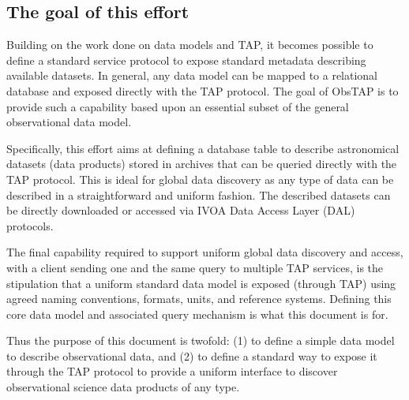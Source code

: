 \documentclass[11pt,a4paper]{ivoa}
\begin{document}
\subsection{The goal of this effort}
Building on the work done on data models and TAP, it becomes possible to define a standard service protocol to expose
standard metadata describing available datasets.  In general, any data model can be mapped to a relational database and
exposed directly with the TAP protocol.  The goal of ObsTAP is to provide such a capability based upon an essential
subset of the general observational data model.

Specifically, this effort aims at defining a database table to describe astronomical datasets (data products) stored in
archives that can be queried directly with the TAP protocol.  This is ideal for global data discovery as any type of
data can be described in a straightforward and uniform fashion.  The described datasets can be directly downloaded or
accessed via IVOA Data Access Layer (DAL) protocols. 

The final capability required to support uniform global data discovery and access, with a client sending one and the
same query to multiple TAP services, is the stipulation that a uniform standard data model is exposed (through TAP)
using agreed naming conventions, formats, units, and reference systems.  Defining this core data model and associated
query mechanism is what this document is for.  

Thus the purpose of this document is twofold: (1) to define a simple data model to describe observational data, and (2)
to define a standard way to expose it through the TAP protocol to provide a uniform interface to discover observational
science data products of any type.
\end{document}
